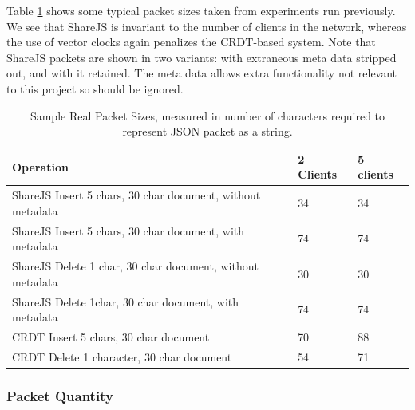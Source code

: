 \documentclass[12pt,a4paper,twoside,openright]{report}
\begin{document}
			Table \ref{tab:samplepacketsizes} shows some typical packet sizes taken from experiments run previously. We see that ShareJS is invariant to the number of clients in the network, whereas the use of vector clocks again penalizes the CRDT-based system. Note that ShareJS packets are shown in two variants: with extraneous meta data stripped out, and with it retained. The meta data allows extra functionality not relevant to this project so should be ignored.
			
			\begin{table}[H]
			\centering
			\caption[Sample Packet Sizes]{Sample Real Packet Sizes, measured in number of characters required to represent JSON packet as a string.}
			\label{tab:samplepacketsizes}
			\setlength{\tabcolsep}{12pt}
			\begin{tabular}{@{}lll@{}}
			Operation													   & 2 Clients & 5 clients \\ \toprule
			ShareJS Insert 5 chars, 30 char document, without metadata & 34        & 34        \\ \midrule
			ShareJS Insert 5 chars, 30 char document, with metadata    & 74        & 74        \\ \midrule
			ShareJS Delete 1 char, 30 char document, without metadata  & 30        & 30        \\ \midrule
			ShareJS Delete 1char, 30 char document, with metadata      & 74        & 74       \\ \midrule
			CRDT Insert 5 chars, 30 char document                      & 70        & 88        \\ \midrule
			CRDT Delete 1 character, 30 char document                  & 54        & 71        \\ \bottomrule

			\end{tabular}
			\end{table}
			
			
			
		\subsubsection{Packet Quantity}
		
\end{document}

